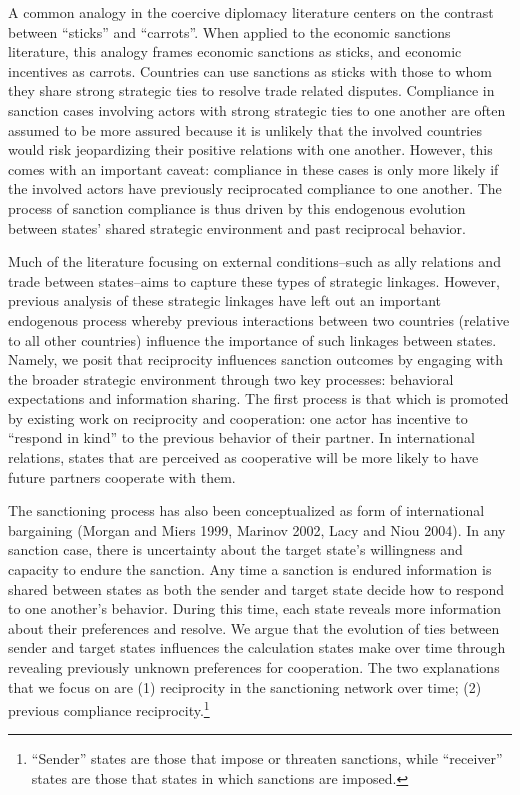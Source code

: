 A common analogy in the coercive diplomacy literature centers on the contrast between ``sticks'' and ``carrots''. When applied to the economic sanctions literature, this analogy frames economic sanctions as sticks, and economic incentives as carrots. Countries can use sanctions as sticks with those to whom they share strong strategic ties to resolve trade related disputes.  Compliance in sanction cases involving actors with strong strategic ties to one another are often assumed to be more assured because it is unlikely that the involved countries would risk jeopardizing their positive relations with one another. However, this comes with an important caveat: compliance in these cases is only more likely if the involved actors have previously reciprocated compliance to one another.  The process of sanction compliance is thus driven by this endogenous evolution between states' shared strategic environment and past reciprocal behavior.

Much of the literature focusing on external conditions--such as ally relations and trade between states--aims to capture these types of strategic linkages. However, previous analysis of these strategic linkages have left out an important endogenous process whereby previous interactions between two countries (relative to all other countries) influence the importance of such linkages between states. Namely, we posit that reciprocity influences sanction outcomes by engaging with the broader strategic environment through two key processes: behavioral expectations and information sharing. The first process is that which is promoted by existing work on reciprocity and cooperation: one actor has incentive to ``respond in kind'' to the previous behavior of their partner. In international relations, states that are perceived as cooperative will be more likely to have future partners cooperate with them.

The sanctioning process has also been conceptualized as form of international bargaining (Morgan and Miers 1999, Marinov 2002, Lacy and Niou 2004). In any sanction case, there is uncertainty about the target state's willingness and capacity to endure the sanction.  Any time a sanction is endured information is shared between states as both the sender and target state decide how to respond to one another's behavior. During this time, each state reveals more information about their preferences and resolve.  We argue that the evolution of ties between sender and target states influences the calculation states make over time through revealing previously unknown preferences for cooperation. The two explanations that we focus on are (1) reciprocity in the sanctioning network over time; (2) previous compliance reciprocity.\footnote{``Sender'' states are those that impose or threaten sanctions, while ``receiver'' states are those that states in which sanctions are imposed.}

